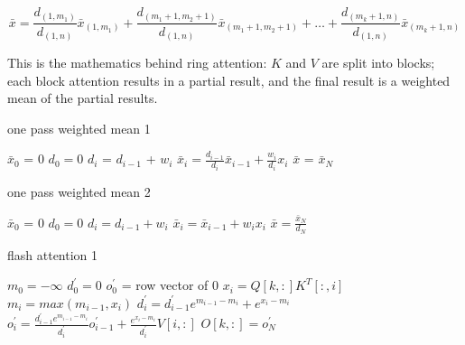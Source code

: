 \documentclass[a4paper]{article}
\begin{document}
    \begin{equation}
        \bar{x} = \frac{d_{(1,m_{1})}}{d_{(1,n)}} \bar{x}_{(1,m_{1})} + \frac{d_{(m_{1}+1,m_{2}+1)}}{d_{(1,n)}} \bar{x}_{(m_{1}+1,m_{2}+1)} +\dots + \frac{d_{(m_{k}+1,n)}}{d_{(1,n)}} \bar{x}_{(m_{k}+1,n)}
    \end{equation}

    This is the mathematics behind ring attention: $K$ and $V$ are split into blocks; each block attention results in a partial result, and the final result is a weighted mean of the partial results.

    \begin{algorithm}
        \caption{one pass weighted mean 1}
        \label{wm1}
        \begin{algorithmic}[1]
            \State $\bar{x}_{0}$ = $0$
            \State $d_0 = 0$
                \State $d_{i}$ = $d_{i-1}$ + $w_{i}$
                \State $\bar{x}_{i} = \frac{d_{i-1}}{ d_{i}} \bar{x}_{i-1}   + \frac{w_i}{d_i}x_i$
            \EndFor
            \State $\bar{x}$ = $\bar{x}_{N}$
        \end{algorithmic}
    \end{algorithm}


    \begin{algorithm}
        \caption{one pass weighted mean 2}
        \label{wm2}
        \begin{algorithmic}[1]
            \State $\bar{x}_{0}$ = $0$
            \State $d_0 = 0$
                \State $d_{i} = d_{i-1} + w_{i}$
                \State $\bar{x}_{i} = \bar{x}_{i-1}+w_{i}x_i$
            \EndFor
            \State $\bar{x} = \frac{\bar{x}_{N}}{d_N}$
        \end{algorithmic}
    \end{algorithm}

    \begin{algorithm}
        \caption{flash attention 1}
        \label{fa1}
        \begin{algorithmic}[1]
            \State $m_0 = -\infty$
            \State $d^\prime_0 = 0 $
            \State $o^\prime_{0}$ = row vector  of 0
                \State $x_{i} = Q[k,:]K^T[:,i] $
                \State $m_{i} =  max(m_{i-1}, x_{i})$
                \State $d^{\prime}_i = d^{\prime}_{i-1} e^{m_{i-1}-m_{i}} + e^{x_i - m_i}$
                \State $o^\prime_{i} = \frac{d^{\prime}_{i-1}e^{m_{i-1}-m_{i}}}{d^{\prime}_{i}} o^\prime_{i-1} + \frac{e^{x_i-m_i}}{d^{\prime}_{i}}V[i,:]$
            \EndFor
            \State $O[k,:] = o^\prime_{N}$
        \end{algorithmic}
    \end{algorithm}
\end{document}
